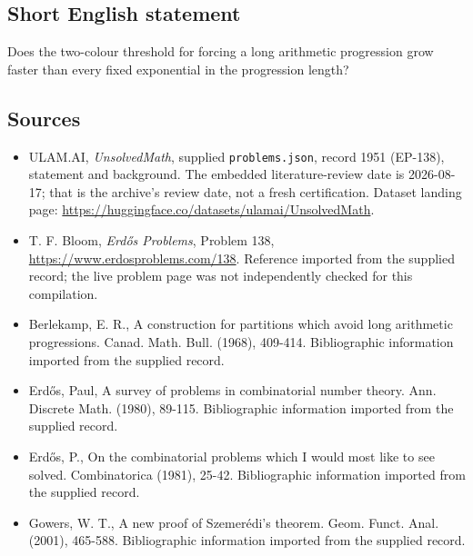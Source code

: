 \documentclass[11pt,a4paper]{article}
\begin{document}
\subsection{Short English statement}

Does the two-colour threshold for forcing a long arithmetic progression grow faster than every fixed exponential in the progression length?

\subsection{Sources}

{\small

\begin{itemize}

\item[\hypertarget{source:1951:1}{S1}] ULAM.AI, \emph{UnsolvedMath}, supplied \texttt{problems.json}, record 1951 (EP-138), statement and background. The embedded literature-review date is 2026-08-17; that is the archive’s review date, not a fresh certification. Dataset landing page: \url{https://huggingface.co/datasets/ulamai/UnsolvedMath}.

\item[\hypertarget{source:1951:2}{S2}] T. F. Bloom, \emph{Erdős Problems}, Problem 138, \url{https://www.erdosproblems.com/138}. Reference imported from the supplied record; the live problem page was not independently checked for this compilation.

\item[\hypertarget{source:1951:3}{S3}] Berlekamp, E. R., A construction for partitions which avoid long arithmetic progressions. Canad. Math. Bull. (1968), 409-414. Bibliographic information imported from the supplied record.

\item[\hypertarget{source:1951:4}{S4}] Erd\H{o}s, Paul, A survey of problems in combinatorial number theory. Ann. Discrete Math. (1980), 89-115. Bibliographic information imported from the supplied record.

\item[\hypertarget{source:1951:5}{S5}] Erd\H{o}s, P., On the combinatorial problems which I would most like to see solved. Combinatorica (1981), 25-42. Bibliographic information imported from the supplied record.

\item[\hypertarget{source:1951:6}{S6}] Gowers, W. T., A new proof of Szemer\'{e}di's theorem. Geom. Funct. Anal. (2001), 465-588. Bibliographic information imported from the supplied record.

\end{itemize}

}

\label{end:1951}
\end{document}
